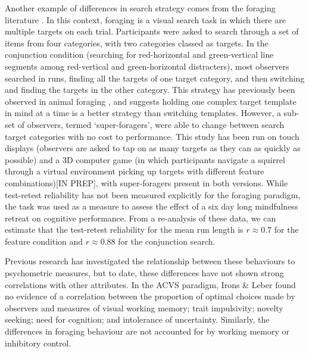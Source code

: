 \documentclass[twocolumn]{article}
\begin{document}
Another example of differences in search strategy comes from the foraging literature \cite{kristjansson2014,johannesson2016}. In this context, foraging is a visual search task in which there are multiple targets on each trial. Participants were asked to search through a set of items from four categories, with two categories classed as targets. In the conjunction condition (searching for red-horizontal and green-vertical line segments among red-vertical and green-horizontal distracters), most observers searched in runs, finding all the targets of one target category, and then switching and finding the targets in the other category. This strategy has previously been observed in animal foraging \cite{dawkins1971}, and suggests holding one complex target template in mind at a time is a better strategy than switching templates. However, a sub-set of observers, termed `super-foragers', were able to change between search target categories with no cost to performance. This study has been run on touch displays\cite{kristjansson2014} (observers are asked to tap on as many targets as they can as quickly as possible) and a 3D computer game (in which participants navigate a squirrel through a virtual environment picking up targets with different feature combinations)[IN PREP], with super-foragers present in both versions. While test-retest reliability has not been measured explicitly for the foraging paradigm, the task was used as a measure to assess the effect of a six day long mindfulness retreat on cognitive performance\cite{hartkamp2017}. From a re-analysis of these data, we can estimate that the test-retest reliability for the mean run length is $r \approx 0.7$ for the feature condition and $r \approx 0.88$ for the conjunction search.  

Previous research has investigated the relationship between these behaviours to psychometric measures, but to date, these differences have not shown strong correlations with other attributes. In the ACVS paradigm, Irons \& Leber found no evidence of a correlation between the proportion of optimal choices made by observers and measures of visual working memory; trait impulsivity\cite{irons-leber2016}; novelty seeking; need for cognition; and intolerance of uncertainty\cite{irons-leber2018}. Similarly, the differences in foraging behaviour are not accounted for by working memory or inhibitory control\cite{johannesson2017}. 
\end{document}
